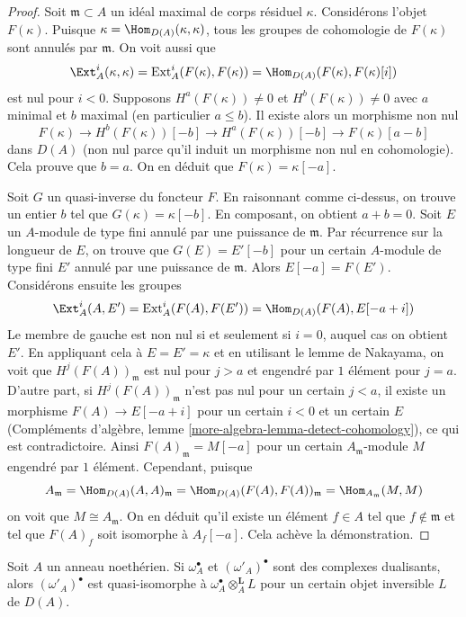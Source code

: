 \begin{proof}
Soit $\mathfrak m \subset A$ un idéal maximal de corps résiduel $\kappa$.
Considérons l'objet $F(\kappa)$. Puisque $\kappa = \Hom_{D(A)}(\kappa, \kappa)$,
tous les groupes de cohomologie de $F(\kappa)$ sont annulés par $\mathfrak m$.
On voit aussi que
$$
\Ext^i_A(\kappa, \kappa) = \text{Ext}^i_A(F(\kappa), F(\kappa))
= \Hom_{D(A)}(F(\kappa), F(\kappa)[i])
$$
est nul pour $i < 0$. Supposons $H^a(F(\kappa)) \not = 0$ et $H^b(F(\kappa)) \not = 0$
avec $a$ minimal et $b$ maximal
(en particulier $a \leq b$). Il existe alors un morphisme non nul
$$
F(\kappa) \to H^b(F(\kappa))[-b] \to H^a(F(\kappa))[-b]
\to F(\kappa)[a - b]
$$
dans $D(A)$ (non nul parce qu'il induit un morphisme non nul en cohomologie).
Cela prouve que $b = a$. On en déduit que $F(\kappa) = \kappa[-a]$.

\medskip\noindent
Soit $G$ un quasi-inverse du foncteur $F$.
En raisonnant comme ci-dessus, on trouve un entier $b$ tel que $G(\kappa) = \kappa[-b]$.
En composant, on obtient $a + b = 0$. Soit $E$ un $A$-module de type fini
annulé par une puissance de $\mathfrak m$. Par récurrence sur la longueur de $E$,
on trouve que $G(E) = E'[-b]$ pour un certain $A$-module de type fini $E'$
annulé par une puissance de $\mathfrak m$. Alors $E[-a] = F(E')$.
Considérons ensuite les groupes
$$
\Ext^i_A(A, E') = \text{Ext}^i_A(F(A), F(E')) =
\Hom_{D(A)}(F(A), E[-a + i])
$$
Le membre de gauche est non nul si et seulement si $i = 0$,
auquel cas on obtient $E'$. En appliquant cela à $E = E' = \kappa$
et en utilisant le lemme de Nakayama, on voit que $H^j(F(A))_\mathfrak m$
est nul pour $j > a$ et engendré par $1$ élément pour $j = a$.
D'autre part, si $H^j(F(A))_\mathfrak m$ n'est pas nul pour un certain $j < a$,
il existe un morphisme $F(A) \to E[-a + i]$ pour un certain $i < 0$
et un certain $E$ (Compléments d'algèbre, lemme \ref{more-algebra-lemma-detect-cohomology}),
ce qui est contradictoire.
Ainsi $F(A)_\mathfrak m = M[-a]$ pour un certain $A_\mathfrak m$-module $M$
engendré par $1$ élément. Cependant, puisque
$$
A_\mathfrak m = \Hom_{D(A)}(A, A)_\mathfrak m =
\Hom_{D(A)}(F(A), F(A))_\mathfrak m = \Hom_{A_\mathfrak m}(M, M)
$$
on voit que $M \cong A_\mathfrak m$. On en déduit qu'il existe un élément $f \in A$
tel que $f \not \in \mathfrak m$ et tel que $F(A)_f$ soit isomorphe à $A_f[-a]$.
Cela achève la démonstration.
\end{proof}

\begin{lemma}
\label{lemma-dualizing-unique}
Soit $A$ un anneau noethérien. Si $\omega_A^\bullet$ et $(\omega'_A)^\bullet$
sont des complexes dualisants, alors $(\omega'_A)^\bullet$ est quasi-isomorphe à
$\omega_A^\bullet \otimes_A^\mathbf{L} L$
pour un certain objet inversible $L$ de $D(A)$.
\end{lemma}

